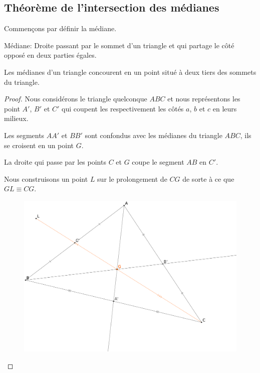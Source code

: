 \documentclass[a4paper,12pt]{article}
\begin{document}
\pagebreak
\subsection{Théorème de l'intersection des médianes}
Commençons par définir la médiane.
\begin{definition}{Médiane:}
Droite passant par le sommet d'un triangle et qui partage le côté opposé en deux parties égales.
\end{definition}

\begin{theorem}
Les médianes d'un triangle concourent en un point situé à deux tiers des sommets du triangle.
\end{theorem}

\begin{proof}
Nous considérons le triangle quelconque $ABC$ et nous représentons les point $A'$, $B'$ et $C'$ qui coupent les respectivement les côtés $a$, $b$ et $c$ en leurs milieux. 
\begin{hyp}
Les segments $AA'$ et $BB'$ sont confondus avec les médianes du triangle $ABC$, ils se croisent en un point $G$.
\end{hyp}
\begin{concl}
La droite qui passe par les points $C$ et $G$ coupe le segment $AB$ en $C'$.
\end{concl}

Nous construisons un point $L$ sur le prolongement de $CG$ de sorte à ce que $GL \equiv CG$.

\begin{figure}[H]
        \centering
        \includegraphics[scale=0.2]{mediane1.eps}
    \end{figure}


\end{proof}
\end{document}
